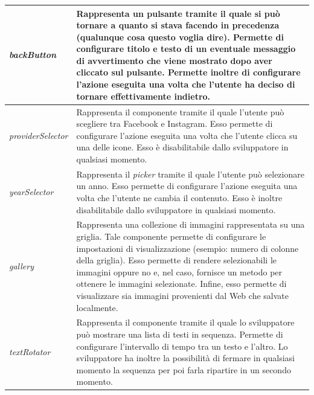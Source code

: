 				\begin{center}
					\begin{tabular}[H]{p{} p{}}
						\emph{backButton}		& Rappresenta un pulsante tramite il quale si può tornare a quanto si
										  stava facendo in precedenza (qualunque cosa questo voglia dire).
										  Permette di configurare titolo e testo di un eventuale messaggio di
										  avvertimento che viene mostrato dopo aver cliccato sul pulsante.
										  Permette inoltre di configurare l'azione eseguita una volta che
										  l'utente ha deciso di tornare effettivamente indietro.\\
						\hline
						\emph{providerSelector}		& Rappresenta il componente tramite il quale l'utente può scegliere
										  tra Facebook e Instagram. Esso permette di configurare l'azione
										  eseguita una volta che l'utente clicca su una delle icone. Esso è
										  disabilitabile dallo sviluppatore in qualsiasi momento.\\
						\hline
						\emph{yearSelector}		& Rappresenta il \emph{picker} tramite il quale l'utente può
										  selezionare un anno. Esso permette di configurare l'azione eseguita
										  una volta che l'utente ne cambia il contenuto. Esso è inoltre
										  disabilitabile dallo sviluppatore in qualsiasi momento.\\
						\hline
						\emph{gallery}			& Rappresenta una collezione di immagini rappresentata su una
										  griglia. Tale componente permette di configurare le impostazioni di
										  visualizzazione (esempio: numero di colonne della griglia). Esso
										  permette di rendere selezionabili le immagini oppure no e, nel
										  caso, fornisce un metodo per ottenere le immagini selezionate.
										  Infine, esso permette di visualizzare sia immagini provenienti dal
										  Web che salvate localmente.\\
						\hline
						\emph{textRotator}		& Rappresenta il componente tramite il quale lo sviluppatore può
										  mostrare una lista di testi in sequenza. Permette di configurare
										  l'intervallo di tempo tra un testo e l'altro. Lo sviluppatore ha
										  inoltre la possibilità di fermare in qualsiasi momento la sequenza
										  per poi farla ripartire in un secondo momento.\\
					\end{tabular}
				\end{center}
